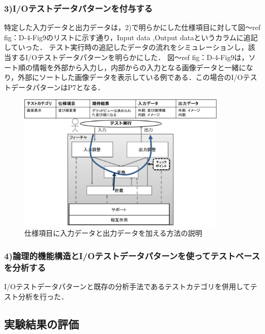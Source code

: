 \documentclass[a4paper,12pt]{jreport}
\begin{document}
\subsubsection{3)I/Oテストデータパターンを付与する}
特定した入力データと出力データは，2)で明らかにした仕様項目に対して図〜ref {fig：D-4-Fig9}のリストに示す通り，Input data ,Output dataというカラムに追記していった．
テスト実行時の追記したデータの流れをシミュレーションし，該当するI/Oテストデータパターンを明らかにした．
図〜ref {fig：D-4-Fig9}は，ソート順の情報を外部から入力し，内部からの入力となる画像データと一緒になり，外部にソートした画像データを表示している例である．この場合のI/OテストデータパターンはP7となる．
   \begin{figure}[htbp]
  \begin{center}
  \includegraphics[width=10cm]{./image/D-4-Fig9.png}
  \caption{仕様項目に入力データと出力データを加える方法の説明}
  \label{fig:D-4-Fig9}
  \end{center}
   \end{figure}

\subsubsection{4)論理的機能構造とI/Oテストデータパターンを使ってテストベースを分析する}
I/Oテストデータパターンと既存の分析手法であるテストカテゴリを併用してテスト分析を行った．

\subsection{実験結果の評価}
\end{document}
